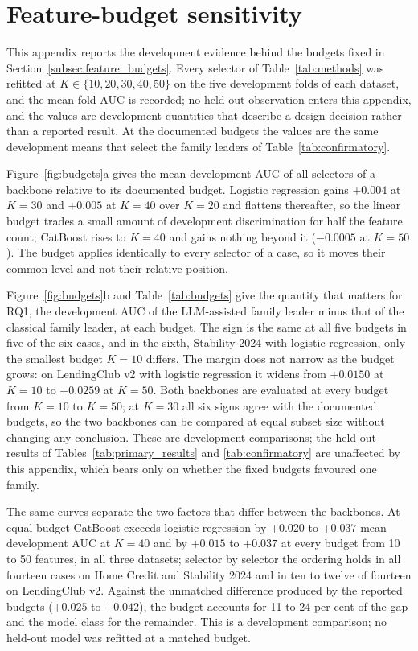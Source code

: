 \documentclass[final,5p,twocolumn]{elsarticle}
\newcommand{\Kfeat}{K}
\begin{document}
\section{Feature-budget sensitivity}
\label{app:budgets}
\setcounter{table}{0}\setcounter{figure}{0}

This appendix reports the development evidence behind the budgets fixed in Section~\ref{subsec:feature_budgets}. Every selector of Table~\ref{tab:methods} was refitted at $\Kfeat \in \{10,20,30,40,50\}$ on the five development folds of each dataset, and the mean fold AUC is recorded; no held-out observation enters this appendix, and the values are development quantities that describe a design decision rather than a reported result. At the documented budgets the values are the same development means that select the family leaders of Table~\ref{tab:confirmatory}.

Figure~\ref{fig:budgets}a gives the mean development AUC of all selectors of a backbone relative to its documented budget. Logistic regression gains $+0.004$ at $\Kfeat=30$ and $+0.005$ at $\Kfeat=40$ over $\Kfeat=20$ and flattens thereafter, so the linear budget trades a small amount of development discrimination for half the feature count; CatBoost rises to $\Kfeat=40$ and gains nothing beyond it ($-0.0005$ at $\Kfeat=50$). The budget applies identically to every selector of a case, so it moves their common level and not their relative position.

Figure~\ref{fig:budgets}b and Table~\ref{tab:budgets} give the quantity that matters for RQ1, the development AUC of the LLM-assisted family leader minus that of the classical family leader, at each budget. The sign is the same at all five budgets in five of the six cases, and in the sixth, Stability 2024 with logistic regression, only the smallest budget $\Kfeat=10$ differs. The margin does not narrow as the budget grows: on LendingClub v2 with logistic regression it widens from $+0.0150$ at $\Kfeat=10$ to $+0.0259$ at $\Kfeat=50$. Both backbones are evaluated at every budget from $\Kfeat=10$ to $\Kfeat=50$; at $\Kfeat=30$ all six signs agree with the documented budgets, so the two backbones can be compared at equal subset size without changing any conclusion. These are development comparisons; the held-out results of Tables~\ref{tab:primary_results} and \ref{tab:confirmatory} are unaffected by this appendix, which bears only on whether the fixed budgets favoured one family.

The same curves separate the two factors that differ between the backbones. At equal budget CatBoost exceeds logistic regression by $+0.020$ to $+0.037$ mean development AUC at $\Kfeat=40$ and by $+0.015$ to $+0.037$ at every budget from 10 to 50 features, in all three datasets; selector by selector the ordering holds in all fourteen cases on Home Credit and Stability 2024 and in ten to twelve of fourteen on LendingClub v2. Against the unmatched difference produced by the reported budgets ($+0.025$ to $+0.042$), the budget accounts for 11 to 24 per cent of the gap and the model class for the remainder. This is a development comparison; no held-out model was refitted at a matched budget.
\end{document}
